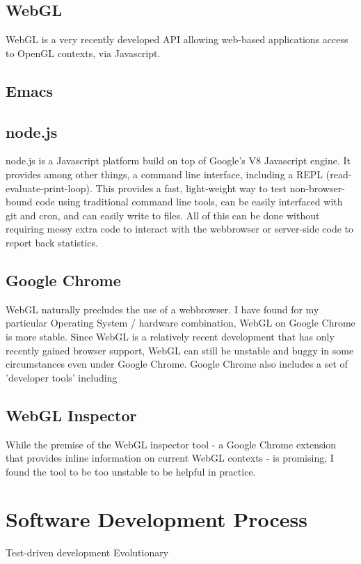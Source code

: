 \documentclass[12pt,twoside,notitlepage]{report}
\begin{document}
\subsection{WebGL}
WebGL is a very recently developed API allowing web-based applications access to OpenGL contexts, via Javascript. 

\subsection{Emacs}

\subsection{node.js}
node.js is a Javascript platform build on top of Google's V8 Javascript engine. It provides among other things, a command line interface, including a REPL (read-evaluate-print-loop). This provides a fast, light-weight way to test non-browser-bound code using traditional command line tools, can be easily interfaced with git and cron, and can easily write to files. All of this can be done without requiring messy extra code to interact with the webbrowser or server-side code to report back statistics.

\subsection{Google Chrome}
WebGL naturally precludes the use of a webbrowser. I have found for my particular Operating System / hardware combination, WebGL on Google Chrome is more stable. Since WebGL is a relatively recent development that has only recently gained browser support, WebGL can still be unstable and buggy in some circumstances even under Google Chrome. Google Chrome also includes a set of 'developer tools' including 

\subsection{WebGL Inspector}
While the premise of the WebGL inspector tool - a Google Chrome extension that provides inline information on current WebGL contexts - is promising, I found the tool to be too unstable to be helpful in practice.

\section{Software Development Process}
Test-driven development
Evolutionary
\end{document}
